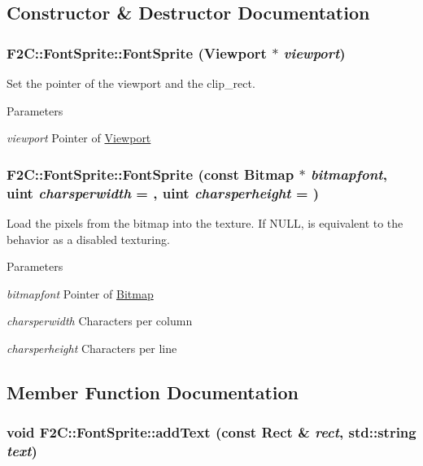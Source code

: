 \subsection{Constructor \& Destructor Documentation}
\hypertarget{class_f2_c_1_1_font_sprite_a7ce4fb660a3b32e3890807dae9b4e850}{
\subsubsection[{FontSprite}]{\setlength{\rightskip}{0pt plus 5cm}F2C::FontSprite::FontSprite ({\bf Viewport} $\ast$ {\em viewport})}}
\label{class_f2_c_1_1_font_sprite_a7ce4fb660a3b32e3890807dae9b4e850}


Set the pointer of the viewport and the clip\_\-rect. 
\begin{DoxyParams}{Parameters}
\item[{\em viewport}]Pointer of \hyperlink{class_f2_c_1_1_viewport}{Viewport} \end{DoxyParams}
\hypertarget{class_f2_c_1_1_font_sprite_a5c7ad536cebfee0660823bef1947e668}{
\subsubsection[{FontSprite}]{\setlength{\rightskip}{0pt plus 5cm}F2C::FontSprite::FontSprite (const {\bf Bitmap} $\ast$ {\em bitmapfont}, \/  {\bf uint} {\em charsperwidth} = {}, \/  {\bf uint} {\em charsperheight} = {})}}
\label{class_f2_c_1_1_font_sprite_a5c7ad536cebfee0660823bef1947e668}


Load the pixels from the bitmap into the texture. If NULL, is equivalent to the behavior as a disabled texturing. 
\begin{DoxyParams}{Parameters}
\item[{\em bitmapfont}]Pointer of \hyperlink{class_f2_c_1_1_bitmap}{Bitmap} \item[{\em charsperwidth}]Characters per column \item[{\em charsperheight}]Characters per line  \end{DoxyParams}


\subsection{Member Function Documentation}
\hypertarget{class_f2_c_1_1_font_sprite_a86138fa37543cdf1c28735b175f55fb8}{
\subsubsection[{addText}]{\setlength{\rightskip}{0pt plus 5cm}void F2C::FontSprite::addText (const {\bf Rect} \& {\em rect}, \/  std::string {\em text})}}
\label{class_f2_c_1_1_font_sprite_a86138fa37543cdf1c28735b175f55fb8}


